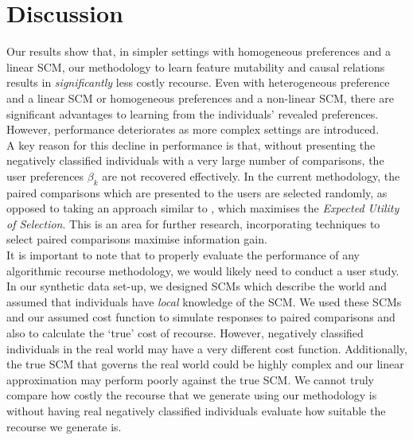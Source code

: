 \section{Discussion} \label{section:discussion}

Our results show that, in simpler settings with homogeneous preferences and a linear SCM, our methodology to learn feature mutability and causal relations results in \textit{significantly} less costly recourse. Even with heterogeneous preference and a linear SCM or homogeneous preferences and a non-linear SCM, there are significant advantages to learning from the individuals' revealed preferences. However, performance deteriorates as more complex settings are introduced. \\

A key reason for this decline in performance is that, without presenting the negatively classified individuals with a very large number of comparisons, the user preferences $\beta_k$ are not recovered effectively. In the current methodology, the paired comparisons  which are presented to the users are selected randomly, as opposed to taking an approach similar to \textcite{detoniPersonalizedAlgorithmicRecourse2023}, which maximises the \textit{Expected Utility of Selection}. This is an area for further research, incorporating techniques to select paired comparisons maximise information gain.\\

It is important to note that to properly evaluate the performance of any algorithmic recourse methodology, we would likely need to conduct a user study. In our synthetic data set-up, we designed SCMs which describe the world and assumed that individuals have \textit{local} knowledge of the SCM. We used these SCMs and our assumed cost function to simulate responses to paired comparisons and also to calculate the `true' cost of recourse. However, negatively classified individuals in the real world may have a very different cost function. Additionally, the true SCM that governs the real world could be highly complex and our linear approximation may perform poorly against the true SCM. We cannot truly compare how costly the recourse that we generate using our methodology is without having real negatively classified individuals evaluate how suitable the recourse we generate is.






